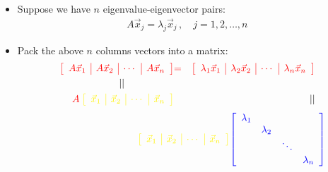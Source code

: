 \documentclass[pdf,9pt]{beamer}
\begin{document}
\begin{frame}[fragile]
\begin{emptytitle}
 \begin{itemize}
    \item Suppose we have $n$ eigenvalue-eigenvector pairs:
	\begin{align*}
	    A \vec{x}_j = \lambda_j \vec{x}_j\,, \quad j = 1, 2, \ldots, n
	\end{align*}
	\bigskip
	\pause
	\vfill
    \item Pack the above $n$ columns vectors into a matrix:\\[1em]
	\begin{eqnarray*}
	    \textcolor{red}{\left[ \begin{array}{c|c|c|c} A\vec{x}_1 & A\vec{x}_2 & \cdots & A\vec{x}_n \end{array} \right]} & \textcolor{red}{=} &
	    \textcolor{red}{\left[ \begin{array}{c|c|c|c}
	    \lambda_1\vec{x}_1 &
	    \lambda_2\vec{x}_2 &
	    \cdots &
	    \lambda_n\vec{x}_n \end{array} \right]} \\
	    ||\hspace{ 5em } 		 &&\\
	    \textcolor{red}{A} \: \textcolor{yellow}{\left[ \begin{array}{c|c|c|c} \vec{x}_1 &  \vec{x}_2  & \cdots &  \vec{x}_n \end{array} \right]}
	    &  & \hspace{4em}||
	\end{eqnarray*}
	\begin{align*}
	    \hspace{9em}
	    \textcolor{yellow}{\left[ \begin{array}{c|c|c|c} \vec{x}_1 &  \vec{x}_2  & \cdots &  \vec{x}_n \end{array} \right]}
	    \textcolor{blue}{\left[ \begin{array}{cccc} \lambda_1 & & & \\ & \lambda_2 & & \\ & & \ddots & \\ & & & \lambda_n \end{array} \right]}
	\end{align*}
\end{itemize}
\end{emptytitle}
\end{frame}
\end{document}
